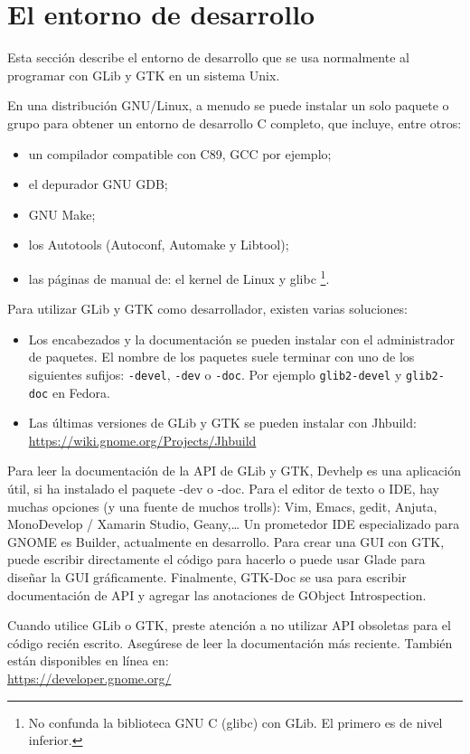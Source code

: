 \section{El entorno de desarrollo}
\label{intro-dev-environment}

Esta sección describe el entorno de desarrollo que se usa normalmente al programar con GLib y GTK en un sistema Unix.

En una distribución GNU/Linux, a menudo se puede instalar un solo paquete o grupo para obtener un entorno de desarrollo C completo, que incluye, entre otros:
\begin{itemize}
    \item un compilador compatible con C89, GCC por ejemplo;
    \item el depurador GNU GDB;
    \item GNU Make;
    \item los Autotools (Autoconf, Automake y Libtool);
    \item las páginas de manual de: el kernel de Linux y glibc \footnote{No confunda la biblioteca GNU C (glibc) con GLib. El primero es de nivel inferior.}.
\end{itemize}

Para utilizar GLib y GTK como desarrollador, existen varias soluciones:
\begin{itemize}
    \item Los encabezados y la documentación se pueden instalar con el administrador de paquetes. El nombre de los paquetes suele terminar con uno de los siguientes sufijos: \texttt{-devel}, \texttt{-dev} o \texttt{-doc}. Por ejemplo \texttt{glib2-devel} y \texttt{glib2-doc} en Fedora.
    \item Las últimas versiones de GLib y GTK se pueden instalar con Jhbuild:\\
    \url{https://wiki.gnome.org/Projects/Jhbuild}
\end{itemize}

Para leer la documentación de la API de GLib y GTK, Devhelp es una aplicación útil, si ha instalado el paquete -dev o -doc. Para el editor de texto o IDE, hay muchas opciones (y una fuente de muchos trolls): Vim, Emacs, gedit, Anjuta, MonoDevelop / Xamarin Studio, Geany,… Un prometedor IDE especializado para GNOME es Builder, actualmente en desarrollo. Para crear una GUI con GTK, puede escribir directamente el código para hacerlo o puede usar Glade para diseñar la GUI gráficamente. Finalmente, GTK-Doc se usa para escribir documentación de API y agregar las anotaciones de GObject Introspection.

Cuando utilice GLib o GTK, preste atención a no utilizar API obsoletas para el código recién escrito. Asegúrese de leer la documentación más reciente. También están disponibles en línea en:\\
\url{https://developer.gnome.org/}